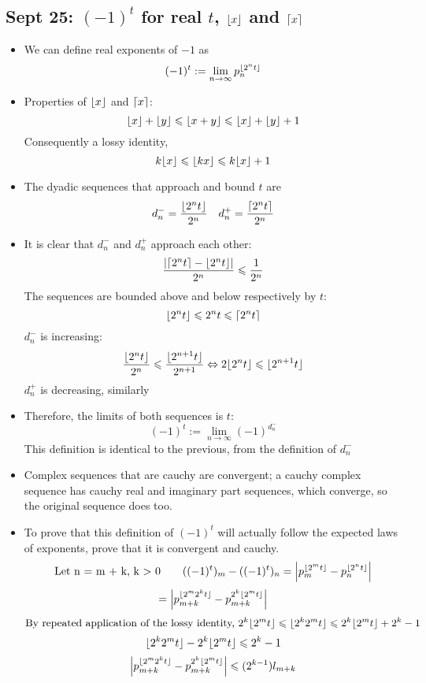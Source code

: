 \documentclass[10pt, oneside]{article}
\newcommand{\lti}[1]{\lim_{#1 \rightarrow \infty}}
\let\leq\leqslant
\DeclarePairedDelimiter\ceil{\lceil}{\rceil}
\DeclarePairedDelimiter\floor{\lfloor}{\rfloor}
\begin{document}
\subsection{Sept 25: $(-1)^t$ for real $t$, $\floor{x}$ and $\ceil{x}$}
\begin{itemize}
    \item We can define real exponents of $-1$ as
        \[(-1)^t := \lti{n} p_n^{\floor{2^n t}}\]
    \item Properties of $\floor{x}$ and $\ceil{x}$:
        \[\floor{x} + \floor{y} \leq \floor{x+y} \leq \floor{x} + \floor{y} + 1\]
        Consequently a lossy identity, 
        \[k \floor{x} \leq \floor{kx} \leq k \floor{x} + 1\]
    \item The dyadic sequences that approach and bound $t$ are
        \[d^-_n = \frac{\floor{2^n t}}{2^n} \quad d^+_n = \frac{\ceil{2^n t}}{2^n}\]
    \item It is clear that $d_n^-$ and $d_n^+$ approach each other:
        \[\frac{|\ceil{2^n t} - \floor{2^n t}|}{2^n} \leq \frac{1}{2^n}\]
        The sequences are bounded above and below respectively by $t$:
        \[\floor{2^n t} \leq 2^n t \leq \ceil{2^n t}\]
        $d_n^-$ is increasing:
        \[\frac{\floor{2^n t}}{2^n} \leq \frac{\floor{2^{n+1} t}}{2^{n+1}} \Leftrightarrow 2 \floor{2^n t} \leq \floor{2^{n+1} t}\]
        $d_n^+$ is decreasing, similarly
    \item Therefore, the limits of both sequences is $t$:
        \[(-1)^t := \lti{n} (-1)^{d_n^-}\]
        This definition is identical to the previous, from the definition of $d_n^-$
    \item Complex sequences that are cauchy are convergent; a cauchy complex sequence has cauchy real and imaginary part sequences, which converge, so the original sequence does too.
    \item To prove that this definition of $(-1)^t$ will actually follow the expected laws of exponents, prove that it is convergent and cauchy.
        \[\text{Let n = m + k, k $>$ 0} \quad \quad ((-1)^t)_m - ((-1)^t)_n = \Big| p_m^{\floor{2^m t}} - p_n^{\floor{2^n t}} \Big|\]
        \[= \Big| p_{m+k}^{\floor{2^m 2^k t}} - p_{m+k}^{2^k \floor{2^m t}} \Big|\]
        \[\text{By repeated application of the lossy identity, } 2^k \floor{2^m t} \leq \floor{2^k 2^m t} \leq 2^k \floor{2^m t} + 2^k - 1\]
        \[\floor{2^k 2^m t} - 2^k \floor{2^m t} \leq 2^k - 1\]
        \[\Big| {p_{m+k}^{\floor{2^m 2^k t}} - p_{m+k}^{2^k \floor{2^m t}}} \Big| \leq (2^{k - 1}) l_{m+k}\]
\end{itemize}
\end{document}
